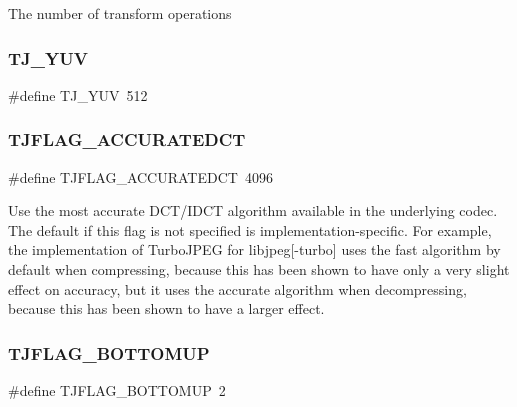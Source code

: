 The number of transform operations \mbox{\label{group___turbo_j_p_e_g_ga8bffe3d10fcd60251343e20291aff9d8}} 
\subsubsection{\texorpdfstring{T\+J\+\_\+\+Y\+UV}{TJ\_YUV}}
{\footnotesize\ttfamily \#define T\+J\+\_\+\+Y\+UV~512}

\mbox{\label{group___turbo_j_p_e_g_gacb233cfd722d66d1ccbf48a7de81f0e0}} 
\subsubsection{\texorpdfstring{T\+J\+F\+L\+A\+G\+\_\+\+A\+C\+C\+U\+R\+A\+T\+E\+D\+CT}{TJFLAG\_ACCURATEDCT}}
{\footnotesize\ttfamily \#define T\+J\+F\+L\+A\+G\+\_\+\+A\+C\+C\+U\+R\+A\+T\+E\+D\+CT~4096}

Use the most accurate D\+C\+T/\+I\+D\+CT algorithm available in the underlying codec. The default if this flag is not specified is implementation-\/specific. For example, the implementation of Turbo\+J\+P\+EG for libjpeg\mbox{[}-\/turbo\mbox{]} uses the fast algorithm by default when compressing, because this has been shown to have only a very slight effect on accuracy, but it uses the accurate algorithm when decompressing, because this has been shown to have a larger effect. \mbox{\label{group___turbo_j_p_e_g_ga72ecf4ebe6eb702d3c6f5ca27455e1ec}} 
\subsubsection{\texorpdfstring{T\+J\+F\+L\+A\+G\+\_\+\+B\+O\+T\+T\+O\+M\+UP}{TJFLAG\_BOTTOMUP}}
{\footnotesize\ttfamily \#define T\+J\+F\+L\+A\+G\+\_\+\+B\+O\+T\+T\+O\+M\+UP~2}

